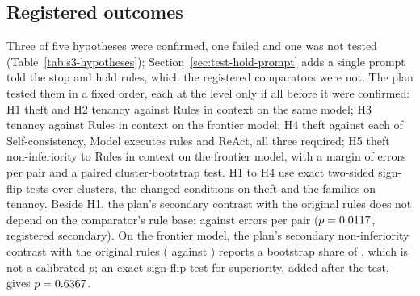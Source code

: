 \subsection{Registered outcomes}
\label{sec:test-hypotheses}

Three of five hypotheses were confirmed, one failed and one was not tested (Table~\ref{tab:s3-hypotheses}); Section~\ref{sec:test-hold-prompt} adds a single prompt told the stop and hold rules, which the registered comparators were not. The plan tested them in a fixed order, each at the \sthreeAlpha{} level only if all before it were confirmed: H1 theft and H2 tenancy against Rules in context on the same model; H3 tenancy against Rules in context on the frontier model; H4 theft against each of Self-consistency, Model executes rules and ReAct, all three required; H5 theft non-inferiority to Rules in context on the frontier model, with a margin of \sthreeHFiveMargin{} errors per pair and a paired cluster-bootstrap test. H1 to H4 use exact two-sided sign-flip tests over clusters, the \sthreeTheftClusters{} changed conditions on theft and the \sthreeTenancyClusters{} families on tenancy. Beside H1, the plan's secondary contrast with the original rules does not depend on the comparator's rule base: \sthreeSecFourCA{} against \sthreeSecFourCB{} errors per pair ($p= 0.0117$, registered secondary). On the frontier model, the plan's secondary non-inferiority contrast with the original rules (\sthreeSecFourBA{} against \sthreeSecFourBB) reports a bootstrap share of \sthreeSecFourBP, which is not a calibrated $p$; an exact sign-flip test for superiority, added after the test, gives $p=0.6367$.


